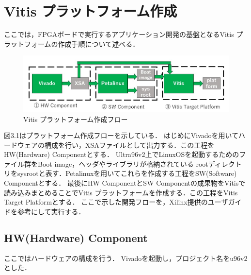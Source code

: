 \documentclass[11pt,a4j]{jreport}
\begin{document}
\section{Vitis プラットフォーム作成}
ここでは，FPGAボードで実行するアプリケーション開発の基盤となるVitis プラットフォームの作成手順について述べる．
\begin{figure}[H]
  \center
  \includegraphics[scale = 0.8]{pict/pict7.jpg}
  \caption{Vitis プラットフォーム作成フロー}
\end{figure}
図3.1はプラットフォーム作成フローを示している．
はじめにVivadoを用いてハードウェアの構成を行い，XSAファイルとして出力する．この工程をHW(Hardware) Componentとする．
Ultra96v2上でLinuxOSを起動するためのファイル群をBoot image，ヘッダやライブラリが格納されている
rootディレクトリをsysrootと表す．Petalinuxを用いてこれらを作成する工程をSW(Software) Componentとする．
最後にHW ComponentとSW Componentの成果物をVitisで読み込みまとめることでVitis プラットフォームを作成する．この工程をVitis Target Platformとする．
ここで示した開発フローを，Xilinx提供のユーザガイド\cite{Xilinx-platform}を参考にして実行する．

\subsection{HW(Hardware) Component}
ここではハードウェアの構成を行う．
Vivadoを起動し，プロジェクト名をu96v2とした．
\end{document}
